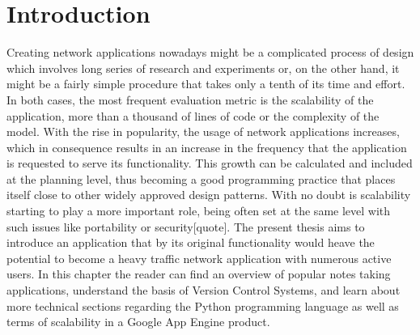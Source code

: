 \chapter{Introduction}
\label{sec:Introduction}
Creating network applications nowadays might be a complicated process of design which involves long series of research and experiments or, on the other hand, it might be a fairly simple procedure that takes only a tenth of its time and effort. In both cases, the most frequent evaluation metric is the scalability of the application, more than a thousand of lines of code or the complexity of the model. With the rise in popularity, the usage of network applications increases, which in consequence results in an increase in the frequency that the application is requested to serve its functionality. This growth can be calculated and included at the planning level, thus becoming a good programming practice that places itself close to other widely approved design patterns. With no doubt is scalability starting to play a more important role, being often set at the same level with such issues like portability or security[quote]. The present thesis aims to introduce an application that by its original functionality would heave the potential to become a heavy traffic network application with numerous active users. In this chapter the reader can find an overview of popular notes taking applications, understand the basis of Version Control Systems, and learn about more technical sections regarding the Python programming language as well as terms of scalability in a Google App Engine product.